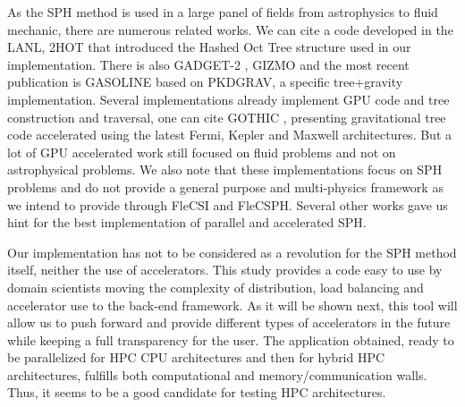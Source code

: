 As the SPH method is used in a large panel of fields from astrophysics to fluid mechanic, there are numerous related works. 
We can cite a code developed in the LANL, 2HOT \cite{warren20132hot} that introduced the Hashed Oct Tree structure used in our implementation. 
There is also GADGET-2 \cite{springel2005cosmological}, GIZMO \cite{hopkins2014gizmo} and the most recent publication is GASOLINE \cite{wadsley2017gasoline2} based on PKDGRAV, a specific tree+gravity implementation. 
Several implementations already implement GPU code and tree construction and traversal, one can cite GOTHIC \cite{miki2017gothic}, presenting gravitational tree code accelerated using the latest Fermi, Kepler and Maxwell architectures. 
But a lot of GPU accelerated work still focused on fluid problems and not on astrophysical problems\cite{harada2007smoothed,crespo2011gpus}.
We also note that these implementations focus on SPH problems and do not provide a general purpose and multi-physics framework as we intend to provide through FleCSI and FleCSPH. 
Several other works gave us hint for the best implementation of parallel and accelerated SPH\cite{ihmsen2011parallel,ihmsen2014sph}.

Our implementation has not to be considered as a revolution for the SPH method itself, neither the use of accelerators. 
This study provides a code easy to use by domain scientists moving the complexity of distribution, load balancing and accelerator use to the back-end framework.
As it will be shown next, this tool will allow us to push forward and provide different types of accelerators in the future while keeping a full transparency for the user.
The application obtained, ready to be parallelized for HPC CPU architectures and then for hybrid HPC architectures, fulfills both computational and memory/communication walls. 
Thus, it seems to be a good candidate for testing HPC architectures.
